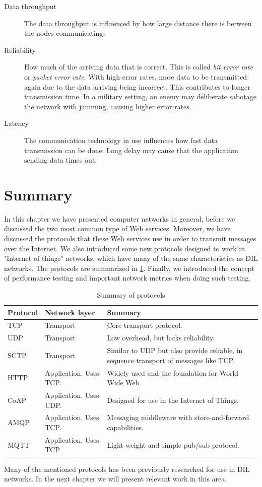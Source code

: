 \begin{description}

\item[Data throughput] The data throughput is influenced by how large distance
there is between the nodes communicating.

\item[Reliability] How much of the arriving data that is correct. This is
called \textit{bit error rate} or \textit{packet error rate}. With high error
rates, more data to be transmitted again due to the data arriving being
incorrect. This contributes to longer transmission time. In a military setting,
an enemy may deliberate sabotage the network with jamming, causing higher error
rates.

\item[Latency] The communication technology in use influences how fast data
transmission can be done. Long delay may cause that the application sending data
times out.

\end{description}

\section{Summary}

In this chapter we have presented computer networks in general, before we
discussed the two most common type of Web services. Moreover, we have discussed
the protocols that these Web services use in order to transmit messages over the
Internet. We also introduced some new protocols designed to work in "Internet of
things" networks, which have many of the same characteristics as DIL networks.
The protocols are summarized in \cref{table:protocols:summary}. Finally, we
introduced the concept of performance testing and important network metrics when
doing such testing.

\begin{table}[h]
\begin{tabularx}{\textwidth}{| l | l | X |}
\hline
  \textbf{Protocol} & \textbf{Network layer} & \textbf{Summary} \\ \hline
  TCP & Transport & Core transport protocol. \\ \hline
  UDP & Transport & Low overhead, but lacks reliability. \\ \hline
  SCTP & Transport & Similar to UDP but also provide reliable, in sequence transport of messages like TCP. \\ \hline
  HTTP & Application. Uses TCP. &  Widely used and the foundation for World Wide Web\\ \hline
  CoAP & Application. Uses UDP. & Designed for use in the Internet of Things. \\ \hline
  AMQP & Application. Uses TCP. &  Messaging middleware with store-and-forward capabilities.\\ \hline
  MQTT & Application. Uses TCP & Light weight and simple pub/sub protocol. \\ \hline
\end{tabularx}
\caption{Summary of protocols}
\label{table:protocols:summary}
\end{table}

Many of the mentioned protocols has been previously researched for use in DIL
networks. In the next chapter we will present relevant work in this area.
